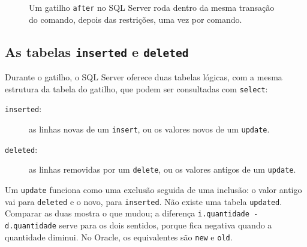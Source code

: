 \begin{figure}[h]
\centering
{}
\caption{Um gatilho \texttt{after} no SQL Server roda dentro da mesma
transação do comando, depois das restrições, uma vez por comando.}
\end{figure}

\subsection{As tabelas \texttt{inserted} e \texttt{deleted}}

Durante o gatilho, o SQL Server oferece duas tabelas lógicas, com a
mesma estrutura da tabela do gatilho, que podem ser consultadas com
\texttt{select}:

\begin{description}
	\item[\texttt{inserted}:] as linhas novas de um \texttt{insert}, ou os
	valores novos de um \texttt{update}.
	\item[\texttt{deleted}:] as linhas removidas por um \texttt{delete}, ou
	os valores antigos de um \texttt{update}.
\end{description}

Um \texttt{update} funciona como uma exclusão seguida de uma inclusão: o
valor antigo vai para \texttt{deleted} e o novo, para \texttt{inserted}.
Não existe uma tabela \texttt{updated}. Comparar as duas mostra o que
mudou; a diferença \texttt{i.quantidade - d.quantidade} serve para os
dois sentidos, porque fica negativa quando a quantidade diminui. No
Oracle, os equivalentes são \texttt{new} e \texttt{old}.

